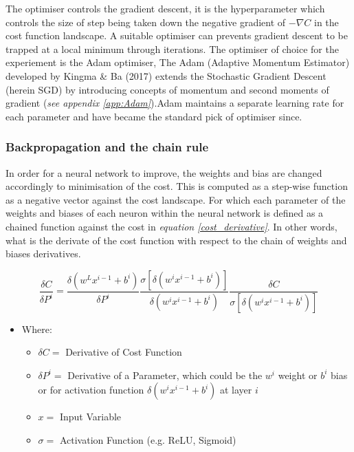 \documentclass[11pt, a4paper, twoside]{report}
\begin{document}
The optimiser controls the gradient descent, it is the hyperparameter which controls the size of step being taken down the negative gradient of $- \nabla C$ in the cost function landscape. A suitable optimiser can prevents gradient descent to be trapped at a local minimum through iterations. The optimiser of choice for the experiement is the Adam optimiser, The Adam (Adaptive Momentum Estimator) developed by Kingma \& Ba (2017) extends the Stochastic Gradient Descent (herein SGD) by introducing concepts of momentum and second moments of gradient (\textit{see appendix \ref{app:Adam}}).Adam maintains a separate learning rate for each parameter and have became the standard pick of optimiser since.\\\par

\subsubsection{Backpropagation and the chain rule}\label{Backprop&Chain}

In order for a neural network to improve, the weights and bias are changed accordingly to minimisation of the cost. This is computed as a step-wise function as a negative vector against the cost landscape. For which each parameter of the weights and biases of each neuron within the neural network is defined as a chained function against the cost in \textit{equation \ref{cost_derivative}}. In other words, what is the derivate of the cost function with respect to the chain of weights and biases derivatives.\\\par

\begin{equation}
  \label{cost_derivative}
  \frac{\delta C}{\delta P^{i}} = \frac{\delta(w^{L}x^{i-1} + b^{i})}{\delta P^{i}} \frac{\sigma[\delta(w^{i}x^{i-1} + b^{i})]}{\delta (w^{i}x^{i-1} + b^{i})} \frac{\delta C}{\sigma[\delta(w^{i}x^{i-1} + b^{i})]}
\end{equation}

\begin{itemize}
  \item Where:
    \begin{itemize}
      \item $\delta C =$ Derivative of Cost Function
      \item $\delta P^{i} =$ Derivative of a Parameter, which could be the $w^{i}$ weight or $b^{i}$ bias or for activation function $\delta(w^{i}x^{i-1} + b^{i})$ at layer $i$
      \item $x = $ Input Variable
      \item $\sigma =$ Activation Function (e.g. ReLU, Sigmoid)
   \end{itemize}
\end{itemize}
\end{document}
